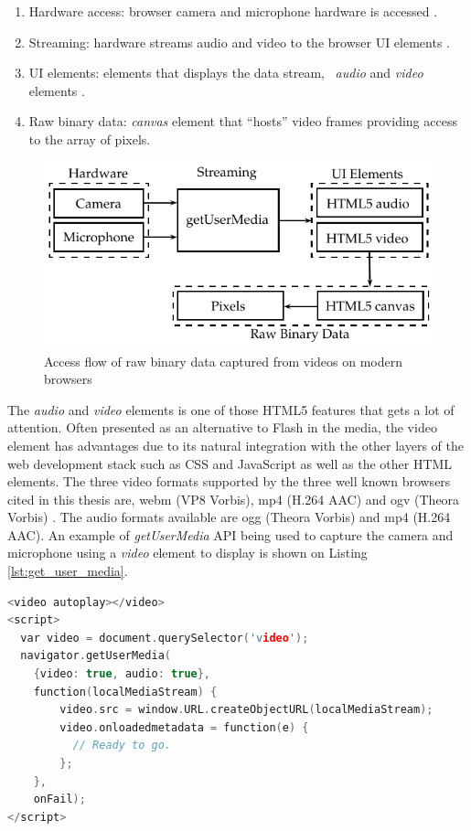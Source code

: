 \begin{enumerate}
  \item  Hardware access: browser camera and microphone hardware is accessed \cite{WebRTC2013}.
  \item Streaming: hardware streams audio and video to the browser UI elements \cite{WebRTC2013}.
  \item UI elements: elements that displays the data stream, \eg\ \textit{audio} and \textit{video} elements \cite{Hickson2013}.
  \item Raw binary data: \textit{canvas} element \cite{Canvas2013} that ``hosts'' video frames providing access to the array of pixels.
\end{enumerate}

\begin{figure}[!htb]
  \centering
  \includegraphics{chapters/basic_concepts/get_user_media.pdf}
  \caption{Access flow of raw binary data captured from videos on modern browsers}
  \label{figure:get_user_media}
\end{figure}

The \textit{audio} and \textit{video} elements is one of those HTML5 \cite{Hickson2013} features that gets a lot of attention. Often presented as an alternative to Flash \cite{Flash2013} in the media, the video element has advantages due to its natural integration with the other layers of the web development stack such as CSS and JavaScript as well as the other HTML elements. The three video formats supported by the three well known browsers cited in this thesis are, webm (VP8 Vorbis), mp4 (H.264 AAC) and ogv (Theora Vorbis) \cite{WC2006} \cite{Rocks2013}. The audio formats available are ogg (Theora Vorbis) and mp4 (H.264 AAC). An example of \textit{getUserMedia} API being used to capture the camera and microphone using a \textit{video} element to display is shown on Listing \ref{lst:get_user_media}.

\begin{lstlisting}[language=C++,label={lst:get_user_media},caption=Capture and display microphone and camera]
<video autoplay></video>
<script>
  var video = document.querySelector('video');
  navigator.getUserMedia(
    {video: true, audio: true},
    function(localMediaStream) {
        video.src = window.URL.createObjectURL(localMediaStream);
        video.onloadedmetadata = function(e) {
          // Ready to go.
        };
    },
    onFail);
</script>
\end{lstlisting}

